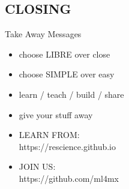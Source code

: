 \documentclass[compress]{beamer}
\begin{document}
\subsection{CLOSING}
{



    \begin{frame}{Take Away Messages}
	\LARGE

	\begin{itemize}
	\item choose LIBRE over close
	\item choose SIMPLE over easy
	\item learn / teach / build / share
	\item give your stuff away 
	\item LEARN FROM: \\	
	https://rescience.github.io 
	\item JOIN US: \\
	https://github.com/ml4mx
	\end{itemize}



   \end{frame}

}


\section{}
\closingtitle



\end{document}
